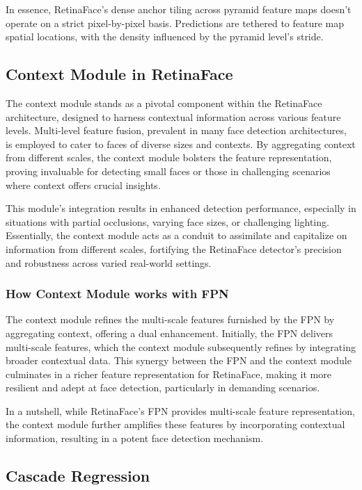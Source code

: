 \documentclass{article}
\begin{document}
In essence, RetinaFace's dense anchor tiling across pyramid feature maps doesn't operate on a strict pixel-by-pixel basis. Predictions are tethered to feature map spatial locations, with the density influenced by the pyramid level's stride.

\subsection{Context Module in RetinaFace}

The context module stands as a pivotal component within the RetinaFace architecture, designed to harness contextual information across various feature levels. Multi-level feature fusion, prevalent in many face detection architectures, is employed to cater to faces of diverse sizes and contexts. By aggregating context from different scales, the context module bolsters the feature representation, proving invaluable for detecting small faces or those in challenging scenarios where context offers crucial insights.

This module's integration results in enhanced detection performance, especially in situations with partial occlusions, varying face sizes, or challenging lighting. Essentially, the context module acts as a conduit to assimilate and capitalize on information from different scales, fortifying the RetinaFace detector's precision and robustness across varied real-world settings.

\subsubsection{How Context Module works with FPN}

The context module refines the multi-scale features furnished by the FPN by aggregating context, offering a dual enhancement. Initially, the FPN delivers multi-scale features, which the context module subsequently refines by integrating broader contextual data. This synergy between the FPN and the context module culminates in a richer feature representation for RetinaFace, making it more resilient and adept at face detection, particularly in demanding scenarios.

In a nutshell, while RetinaFace's FPN provides multi-scale feature representation, the context module further amplifies these features by incorporating contextual information, resulting in a potent face detection mechanism.
\subsection{Cascade Regression}
\end{document}
